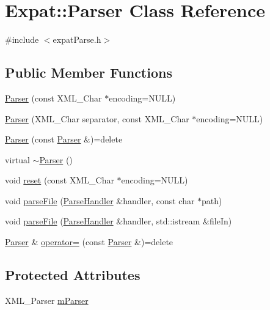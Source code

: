 \hypertarget{class_expat_1_1_parser}{}\section{Expat\+:\+:Parser Class Reference}
\label{class_expat_1_1_parser}


{\ttfamily \#include $<$expat\+Parse.\+h$>$}

\subsection*{Public Member Functions}
\begin{DoxyCompactItemize}
\item 
\hyperlink{class_expat_1_1_parser_a9bf69dbcb4071a2ff9c63e334d07b92a}{Parser} (const X\+M\+L\+\_\+\+Char $\ast$encoding=N\+U\+LL)
\item 
\hyperlink{class_expat_1_1_parser_a22a2acddfb94bc63872a7168e1957f29}{Parser} (X\+M\+L\+\_\+\+Char separator, const X\+M\+L\+\_\+\+Char $\ast$encoding=N\+U\+LL)
\item 
\hyperlink{class_expat_1_1_parser_a117d15428bc6a06ec163f5b5e3cc9653}{Parser} (const \hyperlink{class_expat_1_1_parser}{Parser} \&)=delete
\item 
virtual \hyperlink{class_expat_1_1_parser_a010a8ab512b43fe40ed79f77363773cc}{$\sim$\+Parser} ()
\item 
void \hyperlink{class_expat_1_1_parser_ab3cf9ce85b9dfc2d5b259ef14e293910}{reset} (const X\+M\+L\+\_\+\+Char $\ast$encoding=N\+U\+LL)
\item 
void \hyperlink{class_expat_1_1_parser_af3ac9195ddabde325e21aa2262e1ca4d}{parse\+File} (\hyperlink{class_expat_1_1_parse_handler}{Parse\+Handler} \&handler, const char $\ast$path)
\item 
void \hyperlink{class_expat_1_1_parser_a7c7133c5ec8f562d1520de8a03918c4d}{parse\+File} (\hyperlink{class_expat_1_1_parse_handler}{Parse\+Handler} \&handler, std\+::istream \&file\+In)
\item 
\hyperlink{class_expat_1_1_parser}{Parser} \& \hyperlink{class_expat_1_1_parser_a5091e3622d34fc04f1f51dd5b48e69af}{operator=} (const \hyperlink{class_expat_1_1_parser}{Parser} \&)=delete
\end{DoxyCompactItemize}
\subsection*{Protected Attributes}
\begin{DoxyCompactItemize}
\item 
X\+M\+L\+\_\+\+Parser \hyperlink{class_expat_1_1_parser_ab4d84cca8e9c64aa1acd96a55a86d62f}{m\+Parser}
\end{DoxyCompactItemize}


